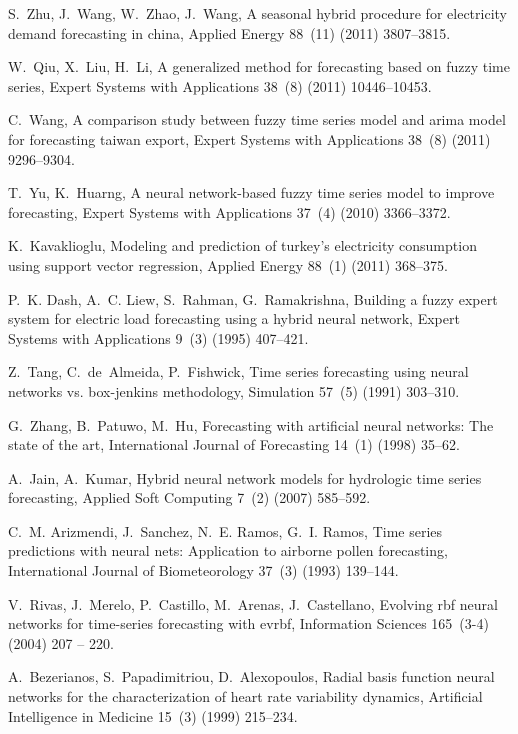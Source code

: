 \documentclass[runningheads]{llncs}
\begin{document}
\begin{thebibliography}{x}
S.~Zhu, J.~Wang, W.~Zhao, J.~Wang, A seasonal hybrid procedure for electricity
  demand forecasting in china, Applied Energy 88~(11) (2011) 3807--3815.

W.~Qiu, X.~Liu, H.~Li, A generalized method for forecasting based on fuzzy time
  series, Expert Systems with Applications 38~(8) (2011) 10446--10453.

C.~Wang, A comparison study between fuzzy time series model and arima model for
  forecasting taiwan export, Expert Systems with Applications 38~(8) (2011)
  9296--9304.

T.~Yu, K.~Huarng, A neural network-based fuzzy time series model to improve
  forecasting, Expert Systems with Applications 37~(4) (2010) 3366--3372.

K.~Kavaklioglu, Modeling and prediction of turkey's electricity consumption
  using support vector regression, Applied Energy 88~(1) (2011) 368--375.

P.~K. Dash, A.~C. Liew, S.~Rahman, G.~Ramakrishna, Building a fuzzy expert
  system for electric load forecasting using a hybrid neural network, Expert
  Systems with Applications 9~(3) (1995) 407--421.

Z.~Tang, C.~de~Almeida, P.~Fishwick, Time series forecasting using neural
  networks vs. box-jenkins methodology, Simulation 57~(5) (1991) 303--310.

G.~Zhang, B.~Patuwo, M.~Hu, Forecasting with artificial neural networks: The
  state of the art, International Journal of Forecasting 14~(1) (1998) 35--62.

A.~Jain, A.~Kumar, Hybrid neural network models for hydrologic time series
  forecasting, Applied Soft Computing 7~(2) (2007) 585--592.

C.~M. Arizmendi, J.~Sanchez, N.~E. Ramos, G.~I. Ramos, Time series predictions
  with neural nets: Application to airborne pollen forecasting, International
  Journal of Biometeorology 37~(3) (1993) 139--144.

V.~Rivas, J.~Merelo, P.~Castillo, M.~Arenas, J.~Castellano, Evolving rbf neural
  networks for time-series forecasting with evrbf, Information Sciences
  165~(3-4) (2004) 207 -- 220.

A.~Bezerianos, S.~Papadimitriou, D.~Alexopoulos, Radial basis function neural
  networks for the characterization of heart rate variability dynamics,
  Artificial Intelligence in Medicine 15~(3) (1999) 215--234.


\end{thebibliography}
\end{document}
